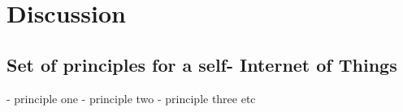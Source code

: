 \documentclass[../main/Self-Stabilization.tex]{subfiles}
\begin{document}
\section{Discussion}

\subsection{Set of principles for a self- Internet of Things}
- principle one 
- principle two
- principle three
etc
\end{document}
